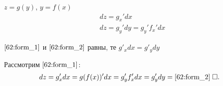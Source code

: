 \documentclass{article}
\begin{document}

$z=g(y)$, $y=f(x)$
\begin{align}
	 & dz=g_{x}'dx\label{62:form_1}                \\
	 & dz=g_{y}'dy=g_{y}'f_{x}'dx\label{62:form_2}
\end{align}

$\eqref{62:form_1}$ и $\eqref{62:form_2}$ равны, те $g'_{x}dx=g'_{y}dy$

\proof

Рассмотрим $\eqref{62:form_1}$:
\begin{align*}
	dz=g_{x}'dx=g(f(x))'dx=g_{y}'f_{x}'dx=g_{y}'dy=\eqref{62:form_2}\qed
\end{align*}
\end{document}
